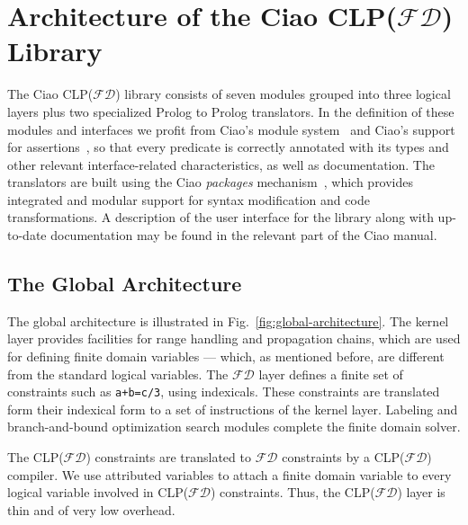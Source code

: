 \documentclass{llncs}
\newcommand{\clpfd}{CLP($\mathcal{FD}$)\xspace}
\newcommand{\fd}{$\mathcal{FD}$\xspace}
\begin{document}
\section{Architecture of the Ciao \clpfd Library}
\label{sec:structure}

The Ciao \clpfd library consists of seven modules grouped into three
logical layers plus two specialized Prolog to Prolog translators. In
the definition of these modules and interfaces we profit from Ciao's
module system~\cite{ciao-modules-cl2000} and Ciao's support for
assertions~\cite{ciaopp-sas03-journal-scp,hermenegildo11:ciao-design-tplp},
so that every predicate is correctly annotated with its types and
other relevant interface-related characteristics, as well as
documentation.  The translators are built using the Ciao
\emph{packages} mechanism~\cite{ciao-modules-cl2000}, which provides
integrated and modular support for syntax modification and code
transformations.
A description of the user interface for the library along with
up-to-date documentation may be found in the relevant part of the Ciao
manual.


\subsection{The Global Architecture}

The global architecture is illustrated in
Fig.~\ref{fig:global-architecture}. The kernel layer provides
facilities for range handling and propagation chains, which are used
for defining finite domain variables --- which, as mentioned before,
are different from the standard logical variables. The \fd layer
defines a finite set of constraints such as \verb!a+b=c/3!, using
indexicals. These constraints are translated form their indexical form
to a set of instructions of the kernel layer. Labeling and
branch-and-bound optimization search modules complete the finite
domain solver.

The \clpfd constraints are translated to \fd constraints by a \clpfd
compiler. We use attributed variables to attach a finite domain
variable to every logical variable involved in \clpfd
constraints. Thus, the \clpfd layer is thin and of very low overhead.
\end{document}
